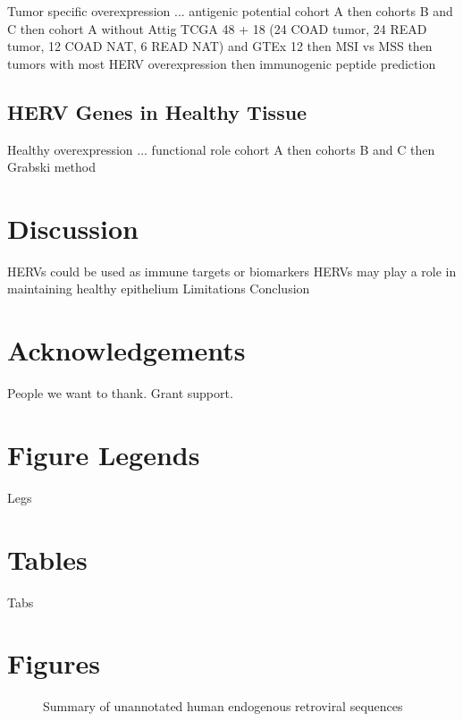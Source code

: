 \documentclass[11pt,letterpaper]{article}
\begin{document}
Tumor specific overexpression ... antigenic potential
cohort A
then cohorts B and C
then cohort A without Attig TCGA 48 + 18 (24 COAD tumor, 24 READ tumor, 12 COAD NAT, 6 READ NAT) and GTEx 12
then MSI vs MSS
then tumors with most HERV overexpression
then immunogenic peptide prediction

\subsection*{HERV Genes in Healthy Tissue}

Healthy overexpression ... functional role
cohort A
then cohorts B and C
then Grabski method

\section*{Discussion}

HERVs could be used as immune targets or biomarkers
HERVs may play a role in maintaining healthy epithelium
Limitations
Conclusion

\section*{Acknowledgements}

People we want to thank. Grant support.




\section*{Figure Legends}

Legs

\section*{Tables}

Tabs

\section*{Figures}

\begin{figure}[ht]
  \caption{Summary of unannotated human endogenous retroviral sequences}
  \label{fig:ele_sum}
\end{figure}
\end{document}
